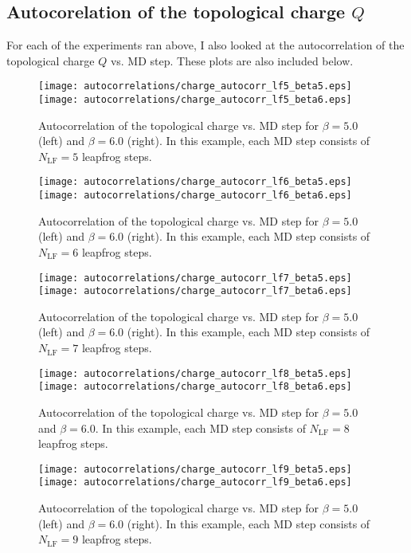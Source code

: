 \subsection{Autocorelation of the topological charge \texorpdfstring{$Q$}{Q}}
%
For each of the experiments ran above, I also looked at the autocorrelation of the topological charge $Q$ vs. MD step.
%
These plots are also included below.
\begin{figure}[htpb]\label{fig:charge_autocorrelation_lf5}
  \texttt{[image: autocorrelations/charge\_autocorr\_lf5\_beta5.eps]}
  \hfill
  \texttt{[image: autocorrelations/charge\_autocorr\_lf5\_beta6.eps]}
  \caption{Autocorrelation of the topological charge vs. MD step for $\beta = 5.0$ (left) and $\beta = 6.0$ (right). In
    this example, each MD step consists of $N_{\mathrm{LF}} = 5$ leapfrog steps.}
\end{figure}
%
\begin{figure}[htpb]\label{fig:charge_autocorrelation_lf6}
  \texttt{[image: autocorrelations/charge\_autocorr\_lf6\_beta5.eps]}
  \hfill
  \texttt{[image: autocorrelations/charge\_autocorr\_lf6\_beta6.eps]}
  \caption{Autocorrelation of the topological charge vs. MD step for $\beta = 5.0$ (left) and $\beta = 6.0$ (right). In
    this example, each MD step consists of $N_{\mathrm{LF}} = 6$ leapfrog steps.}
\end{figure}
%
\begin{figure}[htpb]\label{fig:charge_autocorrelation_lf7}
  \texttt{[image: autocorrelations/charge\_autocorr\_lf7\_beta5.eps]}
  \hfill
  \texttt{[image: autocorrelations/charge\_autocorr\_lf7\_beta6.eps]}
  \caption{Autocorrelation of the topological charge vs. MD step for $\beta = 5.0$ (left) and $\beta = 6.0$ (right). In
    this example, each MD step consists of $N_{\mathrm{LF}} = 7$ leapfrog steps.}
\end{figure}
%
\begin{figure}[htpb]\label{fig:charge_autocorrelation_lf8}
  \texttt{[image: autocorrelations/charge\_autocorr\_lf8\_beta5.eps]}
  \hfill
  \texttt{[image: autocorrelations/charge\_autocorr\_lf8\_beta6.eps]}
  \caption{Autocorrelation of the topological charge vs. MD step for $\beta = 5.0$ and $\beta=6.0$. In this example,
    each MD step consists of $N_{\mathrm{LF}} = 8$ leapfrog steps.}
\end{figure}
%
\begin{figure}[htpb]\label{fig:charge_autocorrelation_lf9}
  \texttt{[image: autocorrelations/charge\_autocorr\_lf9\_beta5.eps]}
  \hfill
  \texttt{[image: autocorrelations/charge\_autocorr\_lf9\_beta6.eps]}
  \caption{Autocorrelation of the topological charge vs. MD step for $\beta = 5.0$ (left) and $\beta = 6.0$ (right). In
    this example, each MD step consists of $N_{\mathrm{LF}} = 9$ leapfrog steps.}
\end{figure}
